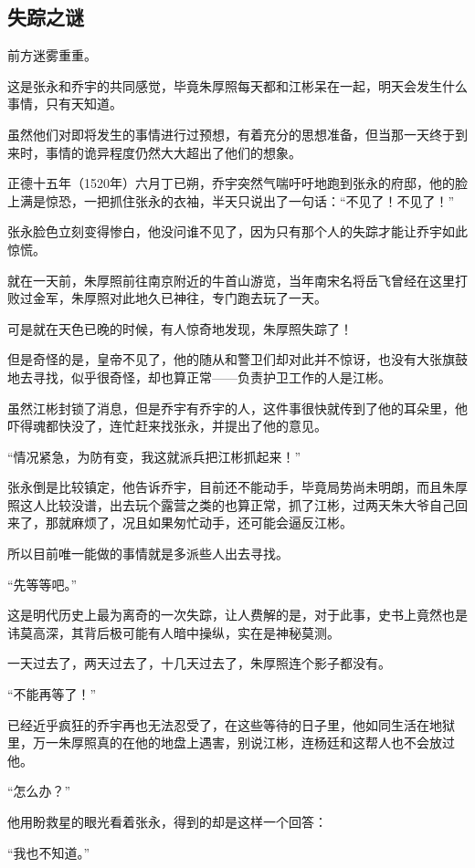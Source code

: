 \begin{multicols}{\theparacolNo}
\subsection{失踪之谜}
前方迷雾重重。

这是张永和乔宇的共同感觉，毕竟朱厚照每天都和江彬呆在一起，明天会发生什么事情，只有天知道。

虽然他们对即将发生的事情进行过预想，有着充分的思想准备，但当那一天终于到来时，事情的诡异程度仍然大大超出了他们的想象。

正德十五年（1520年）六月丁已朔，乔宇突然气喘吁吁地跑到张永的府邸，他的脸上满是惊恐，一把抓住张永的衣袖，半天只说出了一句话：“不见了！不见了！”

张永脸色立刻变得惨白，他没问谁不见了，因为只有那个人的失踪才能让乔宇如此惊慌。

就在一天前，朱厚照前往南京附近的牛首山游览，当年南宋名将岳飞曾经在这里打败过金军，朱厚照对此地久已神往，专门跑去玩了一天。

可是就在天色已晚的时候，有人惊奇地发现，朱厚照失踪了！

但是奇怪的是，皇帝不见了，他的随从和警卫们却对此并不惊讶，也没有大张旗鼓地去寻找，似乎很奇怪，却也算正常——负责护卫工作的人是江彬。

虽然江彬封锁了消息，但是乔宇有乔宇的人，这件事很快就传到了他的耳朵里，他吓得魂都快没了，连忙赶来找张永，并提出了他的意见。

“情况紧急，为防有变，我这就派兵把江彬抓起来！”

张永倒是比较镇定，他告诉乔宇，目前还不能动手，毕竟局势尚未明朗，而且朱厚照这人比较没谱，出去玩个露营之类的也算正常，抓了江彬，过两天朱大爷自己回来了，那就麻烦了，况且如果匆忙动手，还可能会逼反江彬。

所以目前唯一能做的事情就是多派些人出去寻找。

“先等等吧。”

这是明代历史上最为离奇的一次失踪，让人费解的是，对于此事，史书上竟然也是讳莫高深，其背后极可能有人暗中操纵，实在是神秘莫测。

一天过去了，两天过去了，十几天过去了，朱厚照连个影子都没有。

“不能再等了！”

已经近乎疯狂的乔宇再也无法忍受了，在这些等待的日子里，他如同生活在地狱里，万一朱厚照真的在他的地盘上遇害，别说江彬，连杨廷和这帮人也不会放过他。

“怎么办？”

他用盼救星的眼光看着张永，得到的却是这样一个回答：

“我也不知道。”


\end{multicols}
